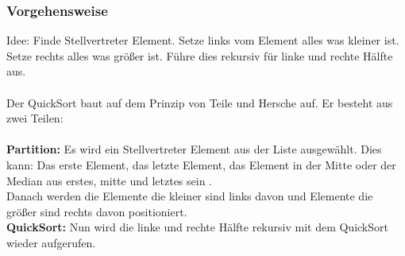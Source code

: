 \documentclass{article}
\begin{document}
\subsubsection{Vorgehensweise}
Idee: Finde Stellvertreter Element. Setze links vom Element alles was kleiner ist. Setze rechts alles was größer ist. Führe dies rekursiv für linke und rechte Hälfte aus.\\
\\
Der QuickSort baut auf dem Prinzip von Teile und Hersche auf. Er besteht aus zwei Teilen:\\ \\
\textbf{Partition:} Es wird ein Stellvertreter Element aus der Liste ausgewählt. Dies kann: Das erste Element, das letzte Element, das Element in der Mitte oder der Median aus erstes, mitte und letztes sein \cite{sedgewick1978pivot}.\\ Danach werden die Elemente die kleiner sind links davon und Elemente die größer sind rechts davon positioniert.\\
\textbf{QuickSort:} Nun wird die linke und rechte Hälfte rekursiv mit dem QuickSort wieder aufgerufen. %
\end{document}
